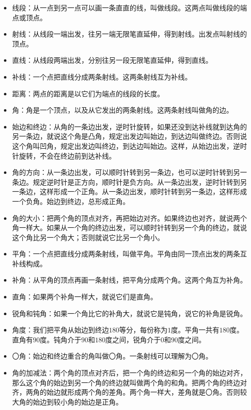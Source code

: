 \documentclass[12pt,UTF8]{ctexbook}
\begin{document}
\begin{itemize}
\item 线段：从一点到另一点可以画一条直直的线，叫做线段。这两点叫做线段的端点或顶点。
\item 射线：从线段一端出发，往另一端无限笔直延伸，得到射线。出发点叫射线的顶点。
\item 直线：从线段两端出发，分别往另一段无限笔直延伸，得到直线。
\item 补线：一个点把直线分成两条射线。这两条射线互为补线。
\item 距离：两点的距离是以它们为端点的线段的长度。
\item 角：角是一个顶点，以及从它发出的两条射线。这两条射线叫做角的边。
\item 始边和终边：从角的一条边出发，逆时针旋转，如果还没到达补线就到达角的另一条边，就说这个角是凸角，规定出发边叫始边，到达边叫做终边。否则说这个角叫凹角，规定出发边叫终边，到达边叫始边。这样，从始边出发，逆时针旋转，不会在终边前到达补线。
\item 角的方向：从一条边出发，可以顺时针转到另一条边，也可以逆时针转到另一条边。规定逆时针是正方向，顺时针是负方向。从一条边出发，逆时针转到另一条边，这样形成一个正角。从一条边出发，顺时针转到另一条边，这样形成一个负角。始边到终边，总形成正角。
\item 角的大小：把两个角的顶点对齐，再把始边对齐。如果终边也对齐，就说两个角一样大。如果从一个角的终边出发，可以顺时针转到另一个角的终边，就说这个角比另一个角大；否则就说它比另一个角小。
\item 平角：一个点把直线分成两条射线，叫做平角。平角由同一顶点出发的两条互补线构成。
\item 补角：从平角的顶点再画一条射线，把平角分成两个角。这两个角互为补角。
\item 直角：如果两个补角一样大，就说它们是直角。
\item 锐角和钝角：如果一个角比它的补角大，就说它是钝角，说它的补角是锐角。
\item 角度：我们把平角从始边到终边\( 180 \)等分，每份称为\( 1 \)度。平角一共有\( 180 \)度。直角有\( 90 \)度。钝角介于\( 90 \)和\( 180 \)度之间，锐角介于\( 0 \)和\( 90 \)度之间。
\item 〇角：始边和终边重合的角叫做〇角。一条射线可以理解为〇角。
\item 角的加减法：两个角的顶点对齐后，把一个角的终边和另一个角的始边对齐，那么这个角的始边到另一个角的终边就叫做两个角的和角。把两个角的终边对齐，两角的始边就形成两个角的差角。两个角一样大，差角就是〇角。否则较大角的始边到较小角的始边是正角。
\end{itemize}
\end{document}

